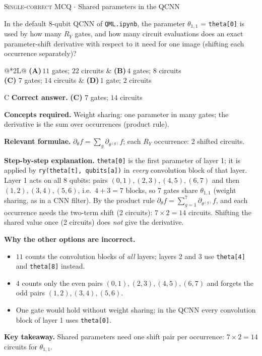 \documentclass[11pt,a4paper]{article}
\newcommand{\optlabel}[1]{\textbf{(#1)}}
\newcommand{\correctlabel}[1]{\textcolor{okgreen}{\textbf{(#1)}\,\ding{51}}}
\newenvironment{qitem}[1]{\begin{list}{}{\setlength{\leftmargin}{3.3em}\setlength{\labelwidth}{3.1em}%
  \setlength{\labelsep}{0.2em}\setlength{\topsep}{3pt}\setlength{\parsep}{3pt}}\item[\textbf{Q.#1}\hfill]}{\end{list}}
\newcommand{\qsep}{\par\vspace{2pt}{\color{black!15}\hrule}\vspace{4pt}}
\newcommand{\qmeta}[2]{{\footnotesize\color{black!60}\textsc{#1} \;$\cdot$\; #2}\par}
\begin{document}
\begin{qitem}{48}
\qmeta{Single-correct MCQ}{Shared parameters in the QCNN}
In the default 8-qubit QCNN of \texttt{QML.ipynb}, the parameter $\theta_{1,1}$ = \texttt{theta[0]} is used by how many
$R_Y$ gates, and how many circuit evaluations does an exact parameter-shift derivative with respect to it need for one image
(shifting each occurrence separately)?
\par\smallskip\noindent\begin{tabularx}{\linewidth}{@{}*{2}{L}@{}}
\optlabel{A}\,$11$ gates; $22$ circuits & \optlabel{B}\,$4$ gates; $8$ circuits \\[3pt]
\correctlabel{C}\,$7$ gates; $14$ circuits & \optlabel{D}\,$1$ gate; $2$ circuits
\end{tabularx}
\end{qitem}
\begin{solbox}{C}
\textbf{\color{brand}Correct answer.} \textcolor{okgreen}{\textbf{(C)}} $7$ gates; $14$ circuits

\textbf{\color{brand}Concepts required.} Weight sharing: one parameter in many gates; the derivative is the sum over occurrences (product rule).

\textbf{\color{brand}Relevant formulae.} $\partial_\theta f = \sum_g\partial_{\theta^{(g)}}f$; each $R_Y$ occurrence: 2 shifted circuits.

\textbf{\color{brand}Step-by-step explanation.} \texttt{theta[0]} is the first parameter of layer 1; it is applied by \texttt{ry(theta[t], qubits[a])} in \emph{every}
convolution block of that layer. Layer 1 acts on all 8 qubits: pairs $(0,1), (2,3), (4,5), (6,7)$ and then $(1,2), (3,4), (5,6)$,
i.e.\ $4 + 3 = 7$ blocks, so 7 gates share $\theta_{1,1}$ (weight sharing, as in a CNN filter). By the product rule
$\partial_\theta f = \sum_{g=1}^{7}\partial_{\theta^{(g)}} f$, and each occurrence needs the two-term shift (2 circuits):
$7\times2 = 14$ circuits. Shifting the shared value once (2 circuits) does \emph{not} give the derivative.

\textbf{\color{brand}Why the other options are incorrect.}
\begin{itemize}[leftmargin=2.4em, itemsep=1pt, topsep=2pt]
\item[\textbf{(A)}] $11$ counts the convolution blocks of \emph{all} layers; layers 2 and 3 use \texttt{theta[4]} and \texttt{theta[8]} instead.
\item[\textbf{(B)}] $4$ counts only the even pairs $(0,1), (2,3), (4,5), (6,7)$ and forgets the odd pairs $(1,2), (3,4), (5,6)$.
\item[\textbf{(D)}] One gate would hold without weight sharing; in the QCNN every convolution block of layer 1 uses \texttt{theta[0]}.
\end{itemize}
\textbf{\color{brand}Key takeaway.} Shared parameters need one shift pair per occurrence: $7\times2 = 14$ circuits for $\theta_{1,1}$.
\end{solbox}
\qsep
\end{document}

